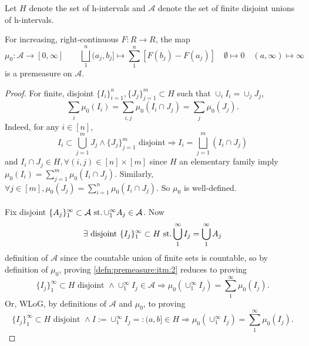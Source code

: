 \begin{prop}\label{prop:1.15}
  Let $H$ denote the set of h-intervals and $\mathcal A$ denote
  the set of finite disjoint unions of h-intervals.

  For increasing, right-continuous $F: R\rightarrow R$,
  the map
  \[
  \mu_0:\mathcal A\rightarrow [0,\infty]
  \qquad \bigsqcup_1^n (a_j, b_j] \mapsto \sum_1^n [F(b_j)-F(a_j)]
    \quad \emptyset \mapsto 0 \quad (a, \infty)\mapsto\infty
    \]
    is a premeasure on $\mathcal A$.
\end{prop}
\begin{proof}
  For finite, disjoint $\{I_i\}_{i=1}^n, \{J_j\}_{j=1}^m\subset H$
  such that $\cup_i I_i = \cup_j J_j$,
  \[
  \sum_i \mu_0(I_i) = \sum_{i,j} \mu_0(I_i\cap J_j) = \sum_j \mu_0(J_j).
  \]
  Indeed, for any $i\in[n]$,
  \[
  I_i \subset \bigcup_{j=1}^m J_j \land \{J_j\}_{j=1}^m \text{ disjoint}
  \Rightarrow I_i = \bigsqcup_{j=1}^m (I_i\cap J_j)
  \]
  and $I_i\cap J_j \in H, \forall (i,j)\in[n]\times[m]$ since $H$
  an elementary family imply
  ${\mu_0(I_i) = \sum_{j=1}^m \mu_0(I_i\cap J_j)}$.
  Similarly,
  $\forall j\in[m],\mu_0(J_j)=\sum_{i=1}^n \mu_0(I_i\cap J_j)$.
  So $\mu_0$ is well-defined.
  \paragraph{}
  Fix disjoint
  $\{A_j\}_1^\infty\subset\mathcal A \operatorname{\,st.} \cup_1^\infty A_j\in\mathcal A$.
  Now
  \[\exists\text{ disjoint }\{I_j\}_1^\infty\subset H \operatorname{\,st.}
  \bigcup_1^\infty I_j = \bigcup_1^\infty A_j \]
  definition of $\mathcal A$ since the countable union of finite sets
  is countable, so by definition of $\mu_0$, proving
  \ref{defn:premeasure:itm:2} reduces to proving
  \[
  \{I_j\}_1^\infty \subset H \text{ disjoint }
  \land \cup_1^\infty I_j \in\mathcal A \Rightarrow
  \mu_0\left(\cup_1^\infty I_j\right)=\sum_1^\infty\mu_0(I_j).
  \]
  Or, WLoG, by definitions of $\mathcal A$ and $\mu_0$, to proving
  \begin{equation}
    \tag{*}
    \{I_j\}_1^\infty \subset H \text{ disjoint }
    \land I:=\cup_1^\infty I_j=:(a,b] \in H \Rightarrow
      \mu_0\left(\cup_1^\infty I_j\right)=\sum_1^\infty\mu_0(I_j).
  \end{equation}

\end{proof}
